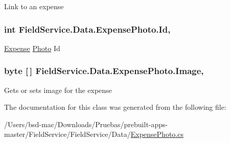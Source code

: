 Link to an expense 

\hypertarget{class_field_service_1_1_data_1_1_expense_photo_ab40fa86d3c3f8187a162da495e20fd86}{
\subsubsection[{Id}]{\setlength{\rightskip}{0pt plus 5cm}int Field\+Service.\+Data.\+Expense\+Photo.\+Id\hspace{0.3cm}{\ttfamily [get]}, {\ttfamily [set]}}}\label{class_field_service_1_1_data_1_1_expense_photo_ab40fa86d3c3f8187a162da495e20fd86}


\hyperlink{class_field_service_1_1_data_1_1_expense}{Expense} \hyperlink{class_field_service_1_1_data_1_1_photo}{Photo} Id 

\hypertarget{class_field_service_1_1_data_1_1_expense_photo_aae448a3d6e804f6221c1b8281a37f731}{
\subsubsection[{Image}]{\setlength{\rightskip}{0pt plus 5cm}byte \mbox{[}$\,$\mbox{]} Field\+Service.\+Data.\+Expense\+Photo.\+Image\hspace{0.3cm}{\ttfamily [get]}, {\ttfamily [set]}}}\label{class_field_service_1_1_data_1_1_expense_photo_aae448a3d6e804f6221c1b8281a37f731}


Gets or sets image for the expense 



The documentation for this class was generated from the following file\+:\begin{DoxyCompactItemize}
\item 
/\+Users/bsd-\/mac/\+Downloads/\+Pruebas/prebuilt-\/apps-\/master/\+Field\+Service/\+Field\+Service/\+Data/\hyperlink{_expense_photo_8cs}{Expense\+Photo.\+cs}\end{DoxyCompactItemize}
